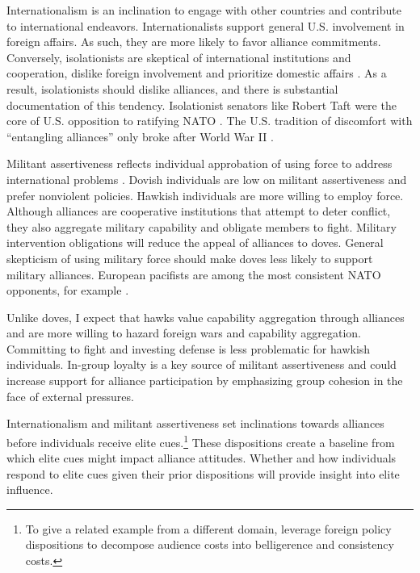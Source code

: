 \documentclass[12pt]{article}
\begin{document}
Internationalism is an inclination to engage with other countries and contribute to international endeavors. 
Internationalists support general U.S. involvement in foreign affairs.
As such, they are more likely to favor alliance commitments. 
Conversely, isolationists are skeptical of international institutions and cooperation, dislike foreign involvement and prioritize domestic affairs \citep{Kertzer2013}. 
As a result, isolationists should dislike alliances, and there is substantial documentation of this tendency. 
Isolationist senators like Robert Taft were the core of U.S. opposition to ratifying NATO \citep{Kaplan2007}.
The U.S. tradition of discomfort with ``entangling alliances'' only broke after World War II \citep{Kupchan2020}.


Militant assertiveness reflects individual approbation of using force to address international problems \citep{Herrmannetal1999}. 
Dovish individuals are low on militant assertiveness and prefer nonviolent policies.
Hawkish individuals are more willing to employ force.
Although alliances are cooperative institutions that attempt to deter conflict, they also aggregate military capability and obligate members to fight.
Military intervention obligations will reduce the appeal of alliances to doves.
General skepticism of using military force should make doves less likely to support military alliances.  
European pacifists are among the most consistent NATO opponents, for example \citep{Thies2015}.


Unlike doves, I expect that hawks value capability aggregation through alliances and are more willing to hazard foreign wars and capability aggregation. 
Committing to fight and investing defense is less problematic for hawkish individuals. 
In-group loyalty is a key source of militant assertiveness \citep{Kertzeretal2014} and could increase support for alliance participation by emphasizing group cohesion in the face of external pressures.


Internationalism and militant assertiveness set inclinations towards alliances before individuals receive elite cues.\footnote{To give a related example from a different domain, \citet{KertzerBrutger2016} leverage foreign policy dispositions to decompose audience costs into belligerence and consistency costs.}
These dispositions create a baseline from which elite cues might impact alliance attitudes. 
Whether and how individuals respond to elite cues given their prior dispositions will provide insight into elite influence. 
\end{document}

